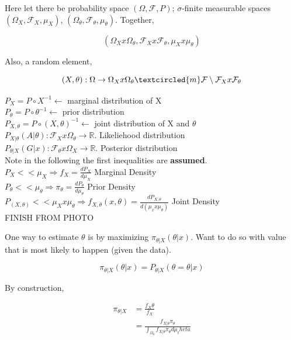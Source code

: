 \documentclass[11pt,fleqn]{book} %
\begin{document}
Here let there be probability space $(\Omega, \mathcal{F}, P)$; $\sigma$-finite measurable spaces $(\Omega_X, \mathcal{F}_X, \mu_X)$, $(\Omega_\theta, \mathcal{F}_\theta, \mu_\theta)$. Together, 

		$$(\Omega_X x \Omega_\theta, \mathcal{F}_X x \mathcal{F}_\theta, \mu_X x \mu_\theta)$$ 


Also, a random element, 

		$$(X, \theta):\Omega \rightarrow \Omega_X x \Omega_\theta \textcircled{m} \mathcal{F}\setminus\mathcal{F}_X x \mathcal{F}_\theta$$


$P_X = P \circ X^{-1} \leftarrow$ marginal distribution of X\\
$P_\theta = P \circ \theta^{-1} \leftarrow$ prior distribution \\
$P_{X, \theta} = P \circ (X, \theta)^{-1} \leftarrow$ joint distribution of X and $\theta$\\
$P_{X|\theta}(A|\theta): \mathcal{F}_X x \Omega_\theta \rightarrow \mathbb{R}$. Likeliehood distribution\\
$P_{\theta|X}(G|x): \mathcal{F}_\theta x \Omega_X \rightarrow \mathbb{R}$. Posterior distribution\\


Note in the following the first inequalities are \textbf{assumed}.\\

$P_X << \mu_X \Rightarrow f_X = \frac{d P_X}{d\mu_X}$ Marginal Density\\
$P_\theta << \mu_\theta \Rightarrow \pi_\theta = \frac{d P_\theta}{d\mu_\theta}$ Prior Density\\
$P_(X, \theta) << \mu_X x \mu_\theta \Rightarrow f_{X, \theta} (x, \theta) = \frac{d P_{X, \theta}}{d(\mu_x x \mu_\theta)}$ Joint Density\\


FINISH FROM PHOTO


One way to estimate $\theta$ is by maximizing $\pi_{\theta|X}(\theta|x)$. Want to do so with value that is most likely to happen (given the data). 

		$$\pi_{\theta|X} (\theta|x) = P_{\theta|X}(\theta = \theta | x) $$

By construction, 

		\begin{align*}
			\pi_{\theta|X} &= \frac{f_X\theta}{f_X}\\
				&= \frac{f_{X|\theta}\pi_\theta}{\int_{\Omega_\theta} f_{X|\theta} \pi_\theta d\mu_theta}
		\end{align*}
\end{document}
